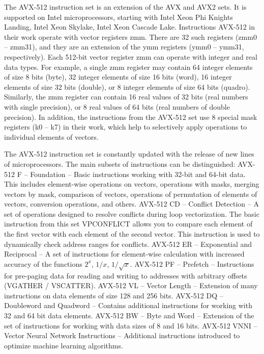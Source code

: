 \documentclass[
11pt,%
tightenlines,%
twoside,%
onecolumn,%
nofloats,%
nobibnotes,%
nofootinbib,%
superscriptaddress,%
noshowpacs,%
centertags]%
{revtex4}
\begin{document}
The AVX-512 instruction set is an extension of the AVX and AVX2 sets.
It is supported on Intel microprocessors, starting with Intel Xeon Phi Knights Landing, Intel Xeon Skylake, Intel Xeon Cascade Lake.
Instructions AVX-512 in their work operate with vector registers zmm.
There are 32 such registers (zmm0 -- zmm31), and they are an extension of the ymm registers (ymm0 -- ymm31, respectively).
Each 512-bit vector register zmm can operate with integer and real data types.
For example, a single zmm register may contain 64 integer elements of size 8 bits (byte), 32 integer elements of size 16 bits (word), 16 integer elements of size 32 bits (double), or 8 integer elements of size 64 bits (quadro).
Similarly, the zmm register can contain 16 real values of 32 bits (real numbers with single precision), or 8 real values of 64 bits (real numbers of double precision).
In addition, the instructions from the AVX-512 set use 8 special mask registers (k0 -- k7) in their work, which help to selectively apply operations to individual elements of vectors.
    
The AVX-512 instruction set is constantly updated with the release of new lines of microprocessors.
The main subsets of instructions can be distinguished:
AVX-512 F -- Foundation -- Basic instructions working with 32-bit and 64-bit data.
This includes element-wise operations on vectors, operations with masks, merging vectors by mask, comparison of vectors, operations of permutation of elements of vectors, conversion operations, and others.
AVX-512 CD -- Conflict Detection -- A set of operations designed to resolve conflicts during loop vectorization. The basic instruction from this set VPCONFLICT allows you to compare each element of the first vector with each element of the second vector. This instruction is used to dynamically check address ranges for conflicts.
AVX-512 ER -- Exponential and Reciprocal -- A set of instructions for element-wise calculation with increased accuracy of the functions $2^x$, $1/x$, $1/\sqrt{x}$.
AVX-512 PF -- Prefetch -- Instructions for pre-paging data for reading and writing to addresses with arbitrary offsets (VGATHER / VSCATTER).
AVX-512 VL -- Vector Length -- Extension of many instructions on data elements of size 128 and 256 bits.
AVX-512 DQ -- Doubleword and Quadword -- Contains additional instructions for working with 32 and 64 bit data elements.
AVX-512 BW -- Byte and Word -- Extension of the set of instructions for working with data sizes of 8 and 16 bits.
AVX-512 VNNI -- Vector Neural Network Instructions -- Additional instructions introduced to optimize machine learning algorithms.
\end{document}
